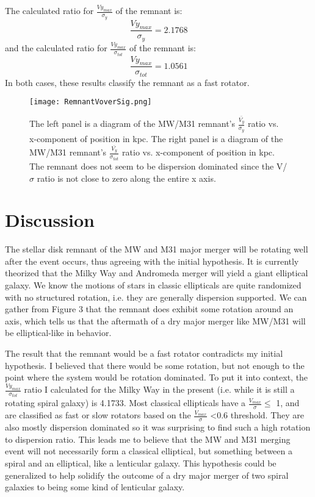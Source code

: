 \documentclass[twocolumn]{aastex63}
\begin{document}
The calculated ratio for $\frac{Vy_{max}}{\sigma_y}$ of the remnant is:
\begin{equation}
    \frac{Vy_{max}}{\sigma_y} = 2.1768
\end{equation}
and the calculated ratio for $\frac{Vy_{max}}{\sigma_{tot}}$ of the remnant is:
\begin{equation}
    \frac{Vy_{max}}{\sigma_{tot}} = 1.0561
\end{equation}
In both cases, these results classify the remnant as a fast rotator.
\begin{figure}
    \centering
    \texttt{[image: RemnantVoverSig.png]}
    \caption{The left panel is a diagram of the MW/M31 remnant's $\frac{\bar{V_y}}{\sigma_y}$ ratio vs. x-component of position in kpc.
    The right panel is a diagram of the MW/M31 remnant's $\frac{\bar{V_y}}{\sigma_{tot}}$ ratio vs. x-component of position in kpc. The remnant does not seem to be dispersion dominated since the V/$\sigma$ ratio is not close to zero along the entire x axis.}
    \label{fig:my_label}
\end{figure}

\section{Discussion} \label{sec:style}

The stellar disk remnant of the MW and M31 major merger will be rotating well after the event occurs, thus agreeing with the initial hypothesis.  It is currently theorized that the Milky Way and Andromeda merger will yield a giant elliptical galaxy. We know the motions of stars in classic ellipticals are quite randomized with no structured rotation, i.e. they are generally dispersion supported.  We can gather from Figure 3 that the remnant does exhibit some rotation around an axis, which tells us that the aftermath of a dry major merger like MW/M31 will be elliptical-like in behavior.

The result that the remnant would be a fast rotator contradicts my initial hypothesis. I believed that there would be some rotation, but not enough to the point where the system would be rotation dominated.  To put it into context, the $\frac{Vy_{max}}{\sigma_{tot}}$ ratio I calculated for the Milky Way in the present (i.e. while it is still a rotating spiral galaxy) is 4.1733. Most classical ellipticals have a $\frac{V_{max}}{\sigma} \leq$ 1, and are classified as fast or slow rotators based on the $\frac{V_{max}}{\sigma}$ \textless 0.6 threshold.  They are also mostly dispersion dominated so it was surprising to find such a high rotation to dispersion ratio.  This leads me to believe that the MW and M31 merging event will not necessarily form a classical elliptical, but something between a spiral and an elliptical, like a lenticular galaxy.  This hypothesis could be generalized to help solidify the outcome of a dry major merger of two spiral galaxies to being some kind of lenticular galaxy.
\end{document}
